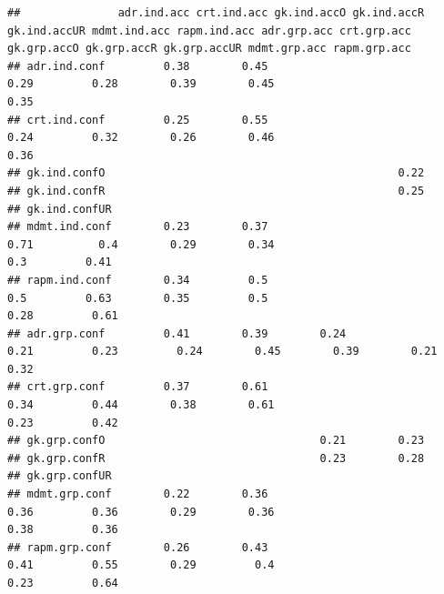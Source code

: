 \documentclass[]{article}
\begin{document}
\begin{verbatim}
##               adr.ind.acc crt.ind.acc gk.ind.accO gk.ind.accR gk.ind.accUR mdmt.ind.acc rapm.ind.acc adr.grp.acc crt.grp.acc gk.grp.accO gk.grp.accR gk.grp.accUR mdmt.grp.acc rapm.grp.acc
## adr.ind.conf         0.38        0.45                                              0.29         0.28        0.39        0.45                                                           0.35
## crt.ind.conf         0.25        0.55                                              0.24         0.32        0.26        0.46                                                           0.36
## gk.ind.confO                                             0.22                                                                                                                              
## gk.ind.confR                                             0.25                                                                                                                              
## gk.ind.confUR                                                                                                                                                                              
## mdmt.ind.conf        0.23        0.37                                              0.71          0.4        0.29        0.34                                               0.3         0.41
## rapm.ind.conf        0.34         0.5                                               0.5         0.63        0.35         0.5                                              0.28         0.61
## adr.grp.conf         0.41        0.39        0.24                     0.21         0.23         0.24        0.45        0.39        0.21                                               0.32
## crt.grp.conf         0.37        0.61                                              0.34         0.44        0.38        0.61                                              0.23         0.42
## gk.grp.confO                                 0.21        0.23                                                                                                                              
## gk.grp.confR                                 0.23        0.28                                                                                                                              
## gk.grp.confUR                                                                                                                                                                              
## mdmt.grp.conf        0.22        0.36                                              0.36         0.36        0.29        0.36                                              0.38         0.36
## rapm.grp.conf        0.26        0.43                                              0.41         0.55        0.29         0.4                                              0.23         0.64
\end{verbatim}
\end{document}
